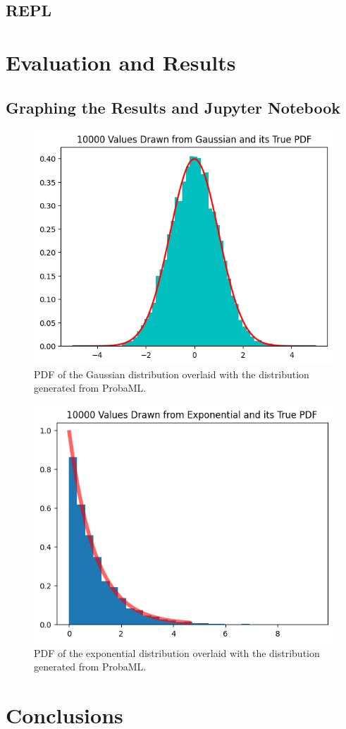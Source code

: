 \documentclass[pageno]{jpaper}
\begin{document}
\subsection{REPL}

\section{Evaluation and Results}
\subsection{Graphing the Results and Jupyter Notebook}

\begin{figure}[hbt]
  \centering
  \includegraphics[scale=1]{gaussian.png}
  \caption{PDF of the Gaussian distribution overlaid with the distribution generated from ProbaML.}
\end{figure}

\begin{figure}[hbt]
  \centering
  \includegraphics[scale=1]{exponential.png}
  \caption{PDF of the exponential distribution overlaid with the distribution generated from ProbaML.}
\end{figure}

\section{Conclusions}



\end{document}
